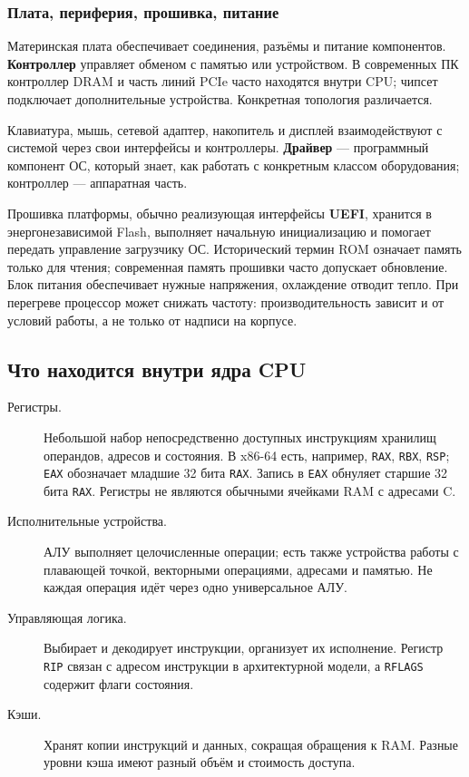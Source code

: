 \subsubsection*{Плата, периферия, прошивка, питание}
Материнская плата обеспечивает соединения, разъёмы и питание компонентов.
\textbf{Контроллер} управляет обменом с памятью или устройством. В современных
ПК контроллер DRAM и часть линий PCIe часто находятся внутри CPU; чипсет
подключает дополнительные устройства. Конкретная топология различается.

Клавиатура, мышь, сетевой адаптер, накопитель и дисплей взаимодействуют
с системой через свои интерфейсы и контроллеры. \textbf{Драйвер} --- программный
компонент ОС, который знает, как работать с конкретным классом оборудования;
контроллер --- аппаратная часть.

Прошивка платформы, обычно реализующая интерфейсы \textbf{UEFI}, хранится
в энергонезависимой Flash, выполняет начальную инициализацию и помогает
передать управление загрузчику ОС. Исторический термин ROM означает память
только для чтения; современная память прошивки часто допускает обновление.
Блок питания обеспечивает нужные напряжения, охлаждение отводит тепло.
При перегреве процессор может снижать частоту: производительность зависит
и от условий работы, а не только от надписи на корпусе.

\subsection{Что находится внутри ядра CPU}
\begin{description}
\item[Регистры.] Небольшой набор непосредственно доступных инструкциям
хранилищ операндов, адресов и состояния. В x86-64 есть, например,
\texttt{RAX}, \texttt{RBX}, \texttt{RSP}; \texttt{EAX} обозначает младшие
32 бита \texttt{RAX}. Запись в \texttt{EAX} обнуляет старшие 32 бита
\texttt{RAX}. Регистры не являются обычными ячейками RAM с адресами C.
\item[Исполнительные устройства.] АЛУ выполняет целочисленные операции;
есть также устройства работы с плавающей точкой, векторными операциями,
адресами и памятью. Не каждая операция идёт через одно универсальное АЛУ.
\item[Управляющая логика.] Выбирает и декодирует инструкции, организует
их исполнение. Регистр \texttt{RIP} связан с адресом инструкции в
архитектурной модели, а \texttt{RFLAGS} содержит флаги состояния.
\item[Кэши.] Хранят копии инструкций и данных, сокращая обращения к RAM.
Разные уровни кэша имеют разный объём и стоимость доступа.
\end{description}

